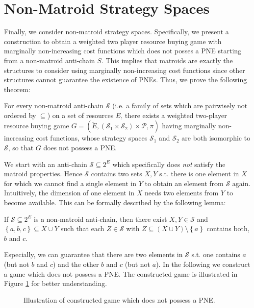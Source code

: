 \documentclass{scrartcl}
\theoremstyle{nonumberplain}
\newcommand{\tupel}[1]{\left(#1\right)}
\newcommand{\set}[1]{\left\{#1\right\}}
\begin{document}
\section{Non-Matroid Strategy Spaces}
Finally, we consider non-matroid strategy spaces. Specifically,
we present a construction to obtain a weighted two player
resource buying game with marginally non-increasing cost functions which does
not posses a PNE starting from a non-matroid anti-chain $S$. This implies that
matroids are exactly the structures to consider using marginally non-increasing
cost functions since other structures cannot guarantee the existence of PNEs.
Thus, we prove the following theorem:
\begin{theo}
  For every non-matroid anti-chain $\mathcal{S}$ (i.e. a family of sets which
  are pairwisely not ordered by $\subseteq$) on a set of resources $E$, there
  exists a weighted two-player resource buying game $G = \tupel{\tilde{E},
    (\mathcal{S}_{1}\times \mathcal{S}_{2})\times\mathcal{P},\pi}$
  having marginally non-increasing cost functions, whose strategy spaces
  $\mathcal{S}_{1}$ and $\mathcal{S}_{2}$ are both isomorphic to $\mathcal{S}$,
  so that $G$ does not possess a PNE.
\end{theo}
We start with an anti-chain $\mathcal{S}\subseteq 2^{E}$ which
specifically does \emph{not} satisfy the matroid properties. Hence
$\mathcal{S}$ contains two sets $X, Y$ s.t. there is one element in $X$ for
which we cannot find a single element in $Y$ to obtain an element from
$\mathcal{S}$ again. Intuitively, the dimension of one element in $X$ needs
two elements from $Y$ to become available. This can be formally described
by the following lemma:
\begin{lemma}
  If $\mathcal{S}\subseteq 2^{E}$ is a non-matroid anti-chain, then there exist
  $X,Y\in\mathcal{S}$ and $\set{a,b,c}\subseteq X\cup Y$ such that each
  $Z\in\mathcal{S}$ with $Z\subseteq(X\cup Y)\setminus\set{a}$ contains both,
  $b$ and $c$.
\end{lemma}
Especially, we can guarantee that there are two elements in $\mathcal{S}$ s.t.
one contains $a$ (but not $b$ and $c$) and the other $b$ and $c$ (but not $a$).
In the following we construct a game which does not possess a PNE. The
constructed game is illustrated in Figure \ref{fig:game} for better
understanding.
\begin{figure}
  
  \caption{Illustration of constructed game which does not possess a PNE.}
  \label{fig:game}
\end{figure}
\end{document}
